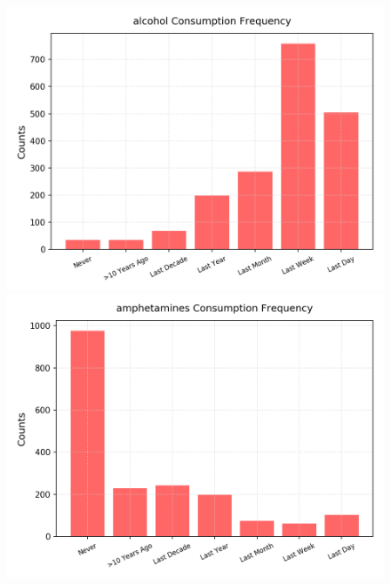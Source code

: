 \documentclass{article}
\begin{document}
\begin{figure}[h!]
	\centering
	\begin{minipage}[b]{0.32\textwidth}
		\includegraphics[width=\textwidth]{plots/drugsPlots/alcohol_freq.png}

	\end{minipage}
	\begin{minipage}[b]{0.32\textwidth}
		\includegraphics[width=\textwidth]{plots/drugsPlots/amphetamines_freq.png}


\end{minipage}
\end{figure}
\end{document}
